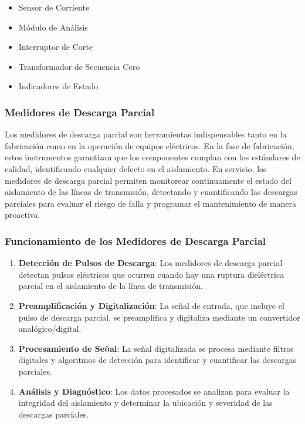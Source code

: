             \begin{itemize}
                \item Sensor de Corriente
                \item Módulo de Análisis
                \item Interruptor de Corte
                \item Transformador de Secuencia Cero
                \item Indicadores de Estado
            \end{itemize}

        \subsubsection{Medidores de Descarga Parcial}

            Los medidores de descarga parcial son herramientas indispensables tanto en la fabricación como en la operación de equipos eléctricos. En la fase de fabricación, estos instrumentos garantizan que los componentes cumplan con los estándares de calidad, identificando cualquier defecto en el aislamiento. En servicio, los medidores de descarga parcial permiten monitorear continuamente el estado del aislamiento de las líneas de transmisión, detectando y cuantificando las descargas parciales para evaluar el riesgo de falla y programar el mantenimiento de manera proactiva.
            
        \subsubsection*{Funcionamiento de los Medidores de Descarga Parcial}

            \begin{enumerate}
                \item \textbf{Detección de Pulsos de Descarga}: Los medidores de descarga parcial detectan pulsos eléctricos que ocurren cuando hay una ruptura dieléctrica parcial en el aislamiento de la línea de transmisión.
                \item \textbf{Preamplificación y Digitalización}: La señal de entrada, que incluye el pulso de descarga parcial, se preamplifica y digitaliza mediante un convertidor analógico/digital.
                \item \textbf{Procesamiento de Señal}: La señal digitalizada se procesa mediante filtros digitales y algoritmos de detección para identificar y cuantificar las descargas parciales.
                \item \textbf{Análisis y Diagnóstico}: Los datos procesados se analizan para evaluar la integridad del aislamiento y determinar la ubicación y severidad de las descargas parciales.
            \end{enumerate}


